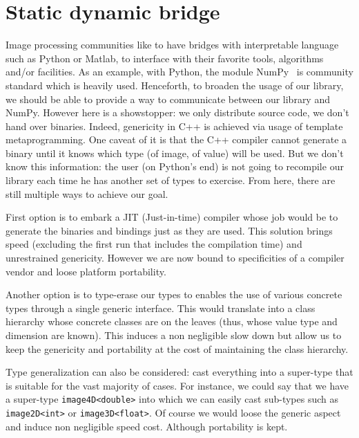 \chapter{Static dynamic bridge}
\label{chap.static_dynamic_bridge}


Image processing communities like to have bridges with interpretable language such as Python or Matlab, to interface
with their favorite tools, algorithms and/or facilities. As an example, with Python, the module
NumPy~\cite{oliphant.2006.numpy} is community standard which is heavily used. Henceforth, to broaden the usage of our
library, we should be able to provide a way to communicate between our library and NumPy. However here is a showstopper:
we only distribute source code, we don't hand over binaries. Indeed, genericity in C++ is achieved via usage of template
metaprogramming. One caveat of it is that the C++ compiler cannot generate a binary until it knows which type (of image,
of value) will be used. But we don't know this information: the user (on Python's end) is not going to recompile our
library each time he has another set of types to exercise. From here, there are still multiple ways to achieve our goal.

First option is to embark a JIT (Just-in-time) compiler whose job would be to generate the binaries and bindings just as
they are used. This solution brings speed (excluding the first run that includes the compilation time) and unrestrained
genericity. However we are now bound to specificities of a compiler vendor and loose platform portability.

Another option is to type-erase our types to enables the use of various concrete types through a single generic
interface. This would translate into a class hierarchy whose concrete classes are on the leaves (thus, whose value type
and dimension are known). This induces a non negligible slow down but allow us to keep the genericity and portability at
the cost of maintaining the class hierarchy.

Type generalization can also be considered: cast everything into a super-type that is suitable for the vast majority of
cases. For instance, we could say that we have a super-type \texttt{image4D<double>} into which we can easily cast
sub-types such as \texttt{image2D<int>} or \texttt{image3D<float>}. Of course we would loose the generic aspect and
induce non negligible speed cost. Although portability is kept.

